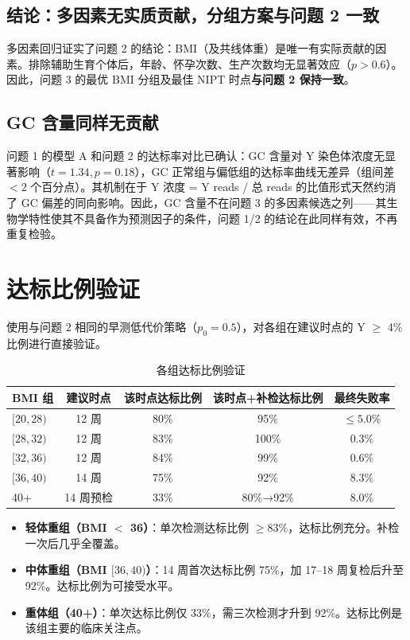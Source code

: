 \documentclass{internal-report}
\begin{document}
\subsection{结论：多因素无实质贡献，分组方案与问题 2 一致}

多因素回归证实了问题 2 的结论：BMI（及共线体重）是唯一有实际贡献的因素。排除辅助生育个体后，年龄、怀孕次数、生产次数均无显著效应（$p > 0.6$）。因此，问题 3 的最优 BMI 分组及最佳 NIPT 时点\textbf{与问题 2 保持一致}。

\subsection{GC 含量同样无贡献}

问题 1 的模型 A 和问题 2 的达标率对比已确认：GC 含量对 Y 染色体浓度无显著影响（$t=1.34, p=0.18$），GC 正常组与偏低组的达标率曲线无差异（组间差 $<2$ 个百分点）。其机制在于 Y 浓度 = Y reads / 总 reads 的比值形式天然约消了 GC 偏差的同向影响。因此，GC 含量不在问题 3 的多因素候选之列——其生物学特性使其不具备作为预测因子的条件，问题 1/2 的结论在此同样有效，不再重复检验。

\section{达标比例验证}

使用与问题 2 相同的早测低代价策略（$p_0=0.5$），对各组在建议时点的 Y $\geq$ 4\% 比例进行直接验证。

\begin{table}[H]
\centering
\caption{各组达标比例验证}
\begin{tabular}{lcccc}
\toprule
BMI 组 & 建议时点 & 该时点达标比例 & 该时点+补检达标比例 & 最终失败率 \\
\midrule
$[20,28)$   & 12 周 & 80\% & 95\% & $\leq 5.0\%$ \\
$[28,32)$   & 12 周 & 83\% & 100\% & 0.3\% \\
$[32,36)$  & 12 周 & 84\% & 99\% & 0.6\% \\
$[36,40)$ & 14 周 & 75\% & 92\% & 8.3\% \\
40+    & 14 周预检 & 33\% & 80\%→92\% & 8.0\% \\
\bottomrule
\end{tabular}
\end{table}

\begin{itemize}
    \item \textbf{轻体重组（BMI $<$ 36）}：单次检测达标比例 $\geq 83\%$，达标比例充分。补检一次后几乎全覆盖。
    \item \textbf{中体重组（BMI $[36,40)$）}：14 周首次达标比例 75\%，加 17--18 周复检后升至 92\%。达标比例为可接受水平。
    \item \textbf{重体组（40+）}：单次达标比例仅 33\%，需三次检测才升到 92\%。达标比例是该组主要的临床关注点。
\end{itemize}
\end{document}
